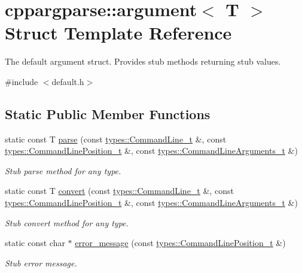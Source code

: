 \hypertarget{structcppargparse_1_1argument}{}\section{cppargparse\+:\+:argument$<$ T $>$ Struct Template Reference}
\label{structcppargparse_1_1argument}


The default argument struct. Provides stub methods returning stub values.  




{\ttfamily \#include $<$default.\+h$>$}

\subsection*{Static Public Member Functions}
\begin{DoxyCompactItemize}
\item 
static const T \hyperlink{structcppargparse_1_1argument_a9b5feac6fe8cf18beb63d85c0840cd84}{parse} (const \hyperlink{types_8h_a80adf2418b7ce9fe616698efa7533ecf}{types\+::\+Command\+Line\+\_\+t} \&, const \hyperlink{types_8h_a43b4f43f8940de1bf09ced6f1b668053}{types\+::\+Command\+Line\+Position\+\_\+t} \&, const \hyperlink{types_8h_a003c660afe2ee9c6cc39aea966e8926d}{types\+::\+Command\+Line\+Arguments\+\_\+t} \&)
\begin{DoxyCompactList}\small\item\em Stub parse method for any type. \end{DoxyCompactList}\item 
static const T \hyperlink{structcppargparse_1_1argument_a2051f71ef4ed0b9d299cc58bb494e42b}{convert} (const \hyperlink{types_8h_a80adf2418b7ce9fe616698efa7533ecf}{types\+::\+Command\+Line\+\_\+t} \&, const \hyperlink{types_8h_a43b4f43f8940de1bf09ced6f1b668053}{types\+::\+Command\+Line\+Position\+\_\+t} \&, const \hyperlink{types_8h_a003c660afe2ee9c6cc39aea966e8926d}{types\+::\+Command\+Line\+Arguments\+\_\+t} \&)
\begin{DoxyCompactList}\small\item\em Stub convert method for any type. \end{DoxyCompactList}\item 
static const char $\ast$ \hyperlink{structcppargparse_1_1argument_a40c742ace10b7eeb56f2e49429f9be33}{error\+\_\+message} (const \hyperlink{types_8h_a43b4f43f8940de1bf09ced6f1b668053}{types\+::\+Command\+Line\+Position\+\_\+t} \&)
\begin{DoxyCompactList}\small\item\em Stub error message. \end{DoxyCompactList}\end{DoxyCompactItemize}



